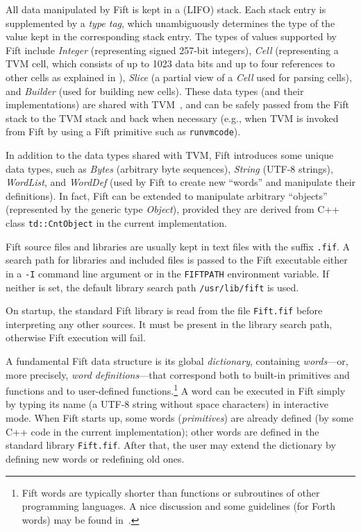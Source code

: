 \documentclass[12pt,oneside]{article}
\begin{document}
All data manipulated by Fift is kept in a (LIFO) stack. Each stack entry is supplemented by a {\em type tag}, which unambiguously determines the type of the value kept in the corresponding stack entry. The types of values supported by Fift include {\em Integer\/} (representing signed 257-bit integers), {\em Cell\/} (representing a TVM cell, which consists of up to 1023 data bits and up to four references to other cells as explained in \cite{TVM}), {\em Slice\/} (a partial view of a {\em Cell\/} used for parsing cells), and {\em Builder\/} (used for building new cells). These data types (and their implementations) are shared with TVM~\cite{TVM}, and can be safely passed from the Fift stack to the TVM stack and back when necessary (e.g., when TVM is invoked from Fift by using a Fift primitive such as {\tt runvmcode}).

In addition to the data types shared with TVM, Fift introduces some unique data types, such as {\em Bytes\/} (arbitrary byte sequences), {\em String\/} (UTF-8 strings), {\em WordList\/}, and {\em WordDef\/} (used by Fift to create new ``words'' and manipulate their definitions). In fact, Fift can be extended to manipulate arbitrary ``objects'' (represented by the generic type {\em Object}), provided they are derived from C++ class {\tt td::CntObject} in the current implementation.

Fift source files and libraries are usually kept in text files with the suffix {\tt .fif}. A search path for libraries and included files is passed to the Fift executable either in a {\tt -I} command line argument or in the {\tt FIFTPATH} environment variable. If neither is set, the default library search path {\tt /usr/lib/fift} is used.

On startup, the standard Fift library is read from the file {\tt Fift.fif} before interpreting any other sources. It must be present in the library search path, otherwise Fift execution will fail.

A fundamental Fift data structure is its global {\em dictionary}, containing {\em words}---or, more precisely, {\em word definitions\/}---that correspond both to built-in primitives and functions and to user-defined functions.\footnote{Fift words are typically shorter than functions or subroutines of other programming languages. A nice discussion and some guidelines (for Forth words) may be found in~\cite{Brodie2}.} A word can be executed in Fift simply by typing its name (a UTF-8 string without space characters) in interactive mode. When Fift starts up, some words ({\em primitives\/}) are already defined (by some C++ code in the current implementation); other words are defined in the standard library {\tt Fift.fif}. After that, the user may extend the dictionary by defining new words or redefining old ones.
\end{document}
